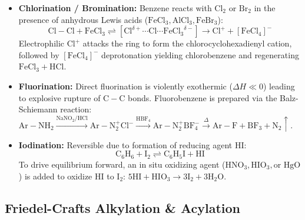 \documentclass[10pt,a4paper]{article}
\begin{document}
\begin{formulabox}
\begin{itemize}
  \item \textbf{Chlorination / Bromination:} Benzene reacts with $\mathrm{Cl_2}$ or $\mathrm{Br_2}$ in the presence of anhydrous Lewis acids ($\mathrm{FeCl_3, AlCl_3, FeBr_3}$):
  \begin{equation}
    \mathrm{Cl-Cl} + \mathrm{FeCl_3} \rightleftharpoons [\mathrm{Cl}^{\delta+}\cdots\mathrm{Cl}\cdots\mathrm{FeCl_3}^{\delta-}] \to \mathrm{Cl^+} + [\mathrm{FeCl_4}]^-
  \end{equation}
  Electrophilic $\mathrm{Cl^+}$ attacks the ring to form the chlorocyclohexadienyl cation, followed by $\mathrm{[FeCl_4]^-}$ deprotonation yielding chlorobenzene and regenerating $\mathrm{FeCl_3} + \mathrm{HCl}$.
  \item \textbf{Fluorination:} Direct fluorination is violently exothermic ($\Delta H \ll 0$) leading to explosive rupture of $\mathrm{C-C}$ bonds. Fluorobenzene is prepared via the Balz-Schiemann reaction: $\mathrm{Ar-NH_2} \xrightarrow{\mathrm{NaNO_2/HCl}} \mathrm{Ar-N_2^+Cl^-} \xrightarrow{\mathrm{HBF_4}} \mathrm{Ar-N_2^+BF_4^-} \xrightarrow{\Delta} \mathrm{Ar-F} + \mathrm{BF_3} + \mathrm{N_2}\uparrow$.
  \item \textbf{Iodination:} Reversible due to formation of reducing agent $\mathrm{HI}$:
  \begin{equation}
    \mathrm{C_6H_6} + \mathrm{I_2} \rightleftharpoons \mathrm{C_6H_5I} + \mathrm{HI}
  \end{equation}
  To drive equilibrium forward, an in situ oxidizing agent ($\mathrm{HNO_3, HIO_3, \text{or } HgO}$) is added to oxidize $\mathrm{HI}$ to $\mathrm{I_2}$:
  $5\mathrm{HI} + \mathrm{HIO_3} \to 3\mathrm{I_2} + 3\mathrm{H_2O}$.
\end{itemize}
\end{formulabox}

\subsection{Friedel-Crafts Alkylation \& Acylation}
\end{document}
